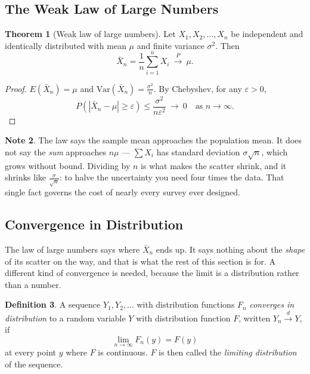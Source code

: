\documentclass[12pt,a4paper]{report}
\theoremstyle{definition}
\newtheorem{thm}{Theorem}[section]
\newtheorem{definition}[thm]{Definition}
\newtheorem{note}[thm]{Note}
\theoremstyle{plain}
\begin{document}
\subsection{The Weak Law of Large Numbers}

\begin{thm}[Weak law of large numbers]
Let $X_1,X_2,\ldots,X_n$ be independent and identically distributed with mean
$\mu$ and finite variance $\sigma^2$. Then
\[\bar X_n=\frac{1}{n}\sum_{i=1}^nX_i\ \overset{P}{\longrightarrow}\ \mu.\]
\end{thm}

\begin{proof}
$E\left(\bar X_n\right)=\mu$ and
$\text{Var}\left(\bar X_n\right)=\frac{\sigma^2}{n}$. By Chebyshev, for any
$\varepsilon>0$,
\[P\left(\left|\bar X_n-\mu\right|\geq\varepsilon\right)
\leq\frac{\sigma^2}{n\varepsilon^2}\ \longrightarrow\ 0
\quad\text{as }n\to\infty.\]
\end{proof}

\begin{note}
The law says the sample mean approaches the population mean. It does not say the
\emph{sum} approaches $n\mu$ --- $\sum X_i$ has standard deviation
$\sigma\sqrt n$, which grows without bound. Dividing by $n$ is what makes the
scatter shrink, and it shrinks like $\frac{\sigma}{\sqrt n}$: to halve the
uncertainty you need four times the data. That single fact governs the cost of
nearly every survey ever designed.
\end{note}

\subsection{Convergence in Distribution}

The law of large numbers says where $\bar X_n$ ends up. It says nothing about the
\emph{shape} of its scatter on the way, and that is what the rest of this section
is for. A different kind of convergence is needed, because the limit is a
distribution rather than a number.

\begin{definition}
A sequence $Y_1,Y_2,\ldots$ with distribution functions $F_n$ \emph{converges in
distribution} to a random variable $Y$ with distribution function $F$, written
$Y_n\overset{d}{\longrightarrow}Y$, if
\[\lim_{n\to\infty}F_n(y)=F(y)\]
at every point $y$ where $F$ is continuous. $F$ is then called the \emph{limiting
distribution} of the sequence.
\end{definition}
\end{document}
